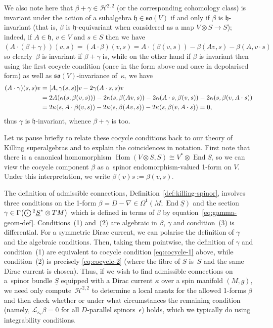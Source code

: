 \documentclass[11pt]{article}
\numberwithin{equation}{section}
\numberwithin{equation}{section}
\newcommand{\fh}{\mathfrak{h}}
\newcommand{\fso}{\mathfrak{so}}
\newcommand{\eL}{\mathscr{L}}
\newcommand{\cH}{\mathcal{H}}
\newcommand{\Sbundle}{\underline{S}}
\newcommand{\Odot}{\mathchoice{{\textstyle\bigodot}}{\bigodot}{\bigodot}{\bigodot}}
\newcommand{\1}{\mathbbm{1}}
\DeclareMathOperator{\End}{End}
\DeclareMathOperator{\Hom}{Hom}
\begin{document}
We also note here that $\beta+\gamma\in\cH^{2,2}$ (or the corresponding cohomology class) is invariant under the action of a subalgebra $\fh\in\fso(V)$ if and only if $\beta$ is $\fh$-invariant (that is, $\beta$ is $\fh$-equivariant when considered as a map $V\otimes S\to S$); indeed, if $A\in\fh$, $v\in V$ and $s\in S$ then we have~${(A\cdot(\beta+\gamma))(v,s) = (A\cdot\beta)(v,s) = A\cdot (\beta(v,s)) - \beta(Av,s) - \beta(A,v\cdot s)}
$
so clearly~$\beta$ is invariant if $\beta+\gamma$ is, while on the other hand if $\beta$ is invariant then using the first cocycle condition (once in the form above and once in depolarised form) as well as $\fso(V)$-invariance of~$\kappa$, we have
\begin{align*}
(A\cdot\gamma)(s,s)v &= \comm{A}{\gamma(s,s)}v - 2\gamma(A\cdot s,s)v \\
	&= 2A(\kappa(s,\beta(v,s))) - 2\kappa(s,\beta(Av,s)) - 2\kappa(A\cdot s,\beta(v,s)) - 2\kappa(s,\beta(v,A\cdot s)) \\
	&= 2\kappa(s,A\cdot\beta(v,s)) - 2\kappa(s,\beta(Av,s)) - 2\kappa(s,\beta(v,A\cdot s))= 0,
\end{align*}
thus $\gamma$ is $\fh$-invariant, whence $\beta+\gamma$ is too.

\begin{Remark}
	Let us pause briefly to relate these cocycle conditions back to our theory of Killing superalgebras and to explain the coincidences in notation. First note that there is a canonical homomorphism $\Hom(V\otimes S,S)\cong V^*\otimes\End S$, so we can view the cocycle component $\beta$ as a~spinor endomorphism-valued 1-form on $V$. Under this interpretation, we write $\beta(v)s:=\beta(v,s)$.
	
	The definition of admissible connections, Definition~\ref{def:killing-spinor}, involves three conditions on the 1-form $\beta=D-\nabla\in\Omega^1(M;\End\Sbundle)$ and the section $\gamma\in\Gamma\bigl(\Odot^2\Sbundle^*\otimes TM\bigr)$ which is defined in terms of $\beta$ by equation~\eqref{eq:gamma-geom-def}. Conditions~(1) and~(2) are algebraic in $\beta$, $\gamma$ and condition~(3) is differential. For a symmetric Dirac current, we can polarise the definition of $\gamma$ and the algebraic conditions. Then, taking them pointwise, the definition of $\gamma$ and condition~(1) are equivalent to cocycle condition \eqref{eq:cocycle-1} above, while condition~(2) is precisely \eqref{eq:cocycle-2} (where the fibre of $\Sbundle$ is~$S$ and the same Dirac current is chosen). Thus, if we wish to find admissible connections on a~spinor bundle $\Sbundle$ equipped with a Dirac current $\kappa$ over a spin manifold $(M,g)$, we need only compute~$\cH^{2,2}$ to determine a local ansatz for the allowed 1-forms $\beta$ and then check whether or under what circumstances the remaining condition (namely, $\eL_{\kappa_\epsilon}\beta=0$ for all $D$-parallel spinors~$\epsilon$) holds, which we typically do using integrability conditions.
\end{Remark}
\end{document}
